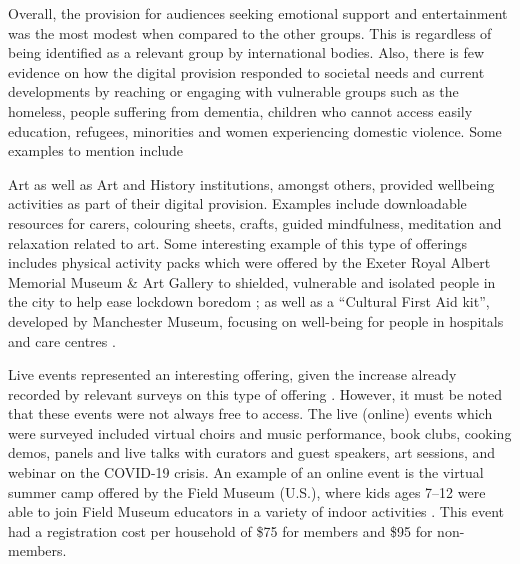 \documentclass{egpubl}
\begin{document}
Overall, the provision for audiences seeking emotional support and entertainment was the most modest when compared to the other groups. This is regardless of being identified as a relevant group by international bodies. Also, there is few evidence on how the digital provision responded to societal needs and current developments by reaching or engaging with vulnerable groups such as the homeless, people suffering from dementia, children who cannot access easily education, refugees, minorities and women experiencing domestic violence. Some examples to mention include 

Art as well as Art and History institutions, amongst others, provided wellbeing activities as part of their digital provision. Examples include downloadable resources for carers, colouring sheets, crafts, guided mindfulness, meditation and relaxation related to art. Some interesting example  of this  type of offerings includes physical activity packs which were offered by the Exeter Royal Albert Memorial Museum \& Art Gallery to shielded, vulnerable and isolated people in the city to help ease lockdown boredom \cite{ex2020}; as well as a ``Cultural First Aid kit'', developed by Manchester Museum, focusing on well-being for people in hospitals and care centres \cite{man2020}. 

Live events represented an interesting offering, given the increase already recorded by relevant surveys on this type of offering \cite{InternationalCouncilofMuseums2020b}. However, it must be noted that these events were not always free to access. The live (online) events which were surveyed included virtual choirs and music performance, book clubs, cooking demos, panels and live talks with curators and guest speakers, art sessions, and webinar on the COVID-19 crisis. An example of an online event is the virtual summer camp offered by the Field Museum (U.S.), where kids ages 7–12 were able to join Field Museum educators in a variety of indoor activities \cite{fieldmuseum}. This event had a registration cost per household of \$75 for members and \$95 for non-members. 



\end{document}
